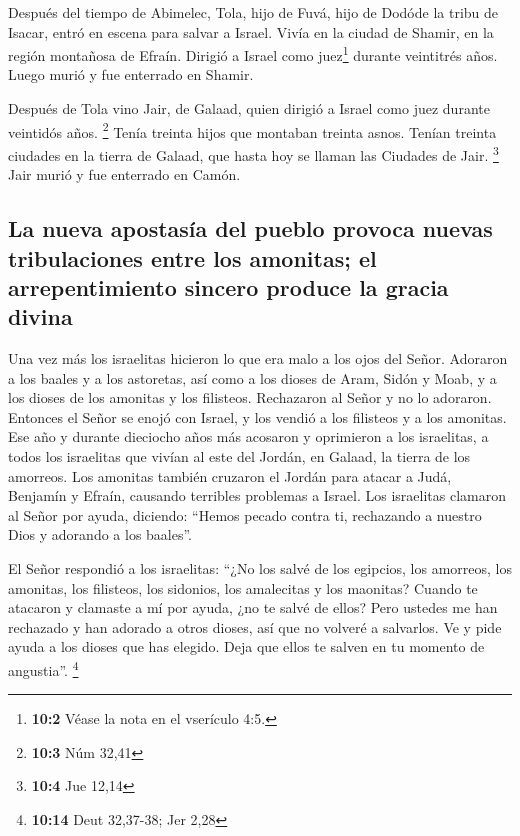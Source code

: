 Después del tiempo de Abimelec, Tola, hijo de Fuvá, hijo
de Dodóde la tribu de Isacar, entró en escena para salvar a Israel.
Vivía en la ciudad de Shamir, en la región montañosa de Efraín.
 Dirigió a Israel como juez\footnote{\textbf{10:2} Véase
  la nota en el vserículo 4:5.} durante veintitrés años. Luego murió y
fue enterrado en Shamir.

 Después de Tola vino Jair, de Galaad, quien dirigió a
Israel como juez durante veintidós años. \footnote{\textbf{10:3} Núm
  32,41}  Tenía treinta hijos que montaban treinta asnos.
Tenían treinta ciudades en la tierra de Galaad, que hasta hoy se llaman
las Ciudades de Jair. \footnote{\textbf{10:4} Jue 12,14} 
Jair murió y fue enterrado en Camón.

\hypertarget{la-nueva-apostasuxeda-del-pueblo-provoca-nuevas-tribulaciones-entre-los-amonitas-el-arrepentimiento-sincero-produce-la-gracia-divina}{%
\subsection{La nueva apostasía del pueblo provoca nuevas tribulaciones
entre los amonitas; el arrepentimiento sincero produce la gracia
divina}\label{la-nueva-apostasuxeda-del-pueblo-provoca-nuevas-tribulaciones-entre-los-amonitas-el-arrepentimiento-sincero-produce-la-gracia-divina}}

 Una vez más los israelitas hicieron lo que era malo a los
ojos del Señor. Adoraron a los baales y a los astoretas, así como a los
dioses de Aram, Sidón y Moab, y a los dioses de los amonitas y los
filisteos. Rechazaron al Señor y no lo adoraron.  Entonces
el Señor se enojó con Israel, y los vendió a los filisteos y a los
amonitas.  Ese año y durante dieciocho años más acosaron y
oprimieron a los israelitas, a todos los israelitas que vivían al este
del Jordán, en Galaad, la tierra de los amorreos.  Los
amonitas también cruzaron el Jordán para atacar a Judá, Benjamín y
Efraín, causando terribles problemas a Israel.  Los
israelitas clamaron al Señor por ayuda, diciendo: ``Hemos pecado contra
ti, rechazando a nuestro Dios y adorando a los baales''.

 El Señor respondió a los israelitas: ``¿No los salvé de
los egipcios, los amorreos, los amonitas, los filisteos, 
los sidonios, los amalecitas y los maonitas? Cuando te atacaron y
clamaste a mí por ayuda, ¿no te salvé de ellos?  Pero
ustedes me han rechazado y han adorado a otros dioses, así que no
volveré a salvarlos.  Ve y pide ayuda a los dioses que
has elegido. Deja que ellos te salven en tu momento de angustia''.
\footnote{\textbf{10:14} Deut 32,37-38; Jer 2,28}

